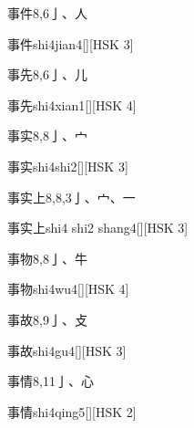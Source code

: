 \begin{entry}{事件}{8,6}{⼅、⼈}
  \begin{phonetics}{事件}{shi4jian4}[][HSK 3]
  \end{phonetics}
\end{entry}

\begin{entry}{事先}{8,6}{⼅、⼉}
  \begin{phonetics}{事先}{shi4xian1}[][HSK 4]
  \end{phonetics}
\end{entry}

\begin{entry}{事实}{8,8}{⼅、⼧}
  \begin{phonetics}{事实}{shi4shi2}[][HSK 3]
  \end{phonetics}
\end{entry}

\begin{entry}{事实上}{8,8,3}{⼅、⼧、⼀}
  \begin{phonetics}{事实上}{shi4 shi2 shang4}[][HSK 3]
  \end{phonetics}
\end{entry}

\begin{entry}{事物}{8,8}{⼅、⽜}
  \begin{phonetics}{事物}{shi4wu4}[][HSK 4]
  \end{phonetics}
\end{entry}

\begin{entry}{事故}{8,9}{⼅、⽁}
  \begin{phonetics}{事故}{shi4gu4}[][HSK 3]
  \end{phonetics}
\end{entry}

\begin{entry}{事情}{8,11}{⼅、⼼}
  \begin{phonetics}{事情}{shi4qing5}[][HSK 2]
  \end{phonetics}
\end{entry}

